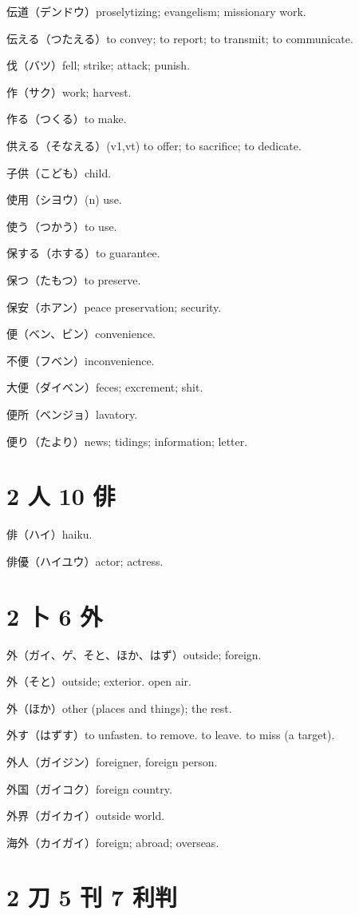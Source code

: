 伝道（デンドウ）proselytizing; evangelism; missionary work.

伝える（つたえる）to convey; to report; to transmit; to communicate.

伐（バツ）fell; strike; attack; punish.

作（サク）work; harvest.

作る（つくる）to make.

供える（そなえる）(v1,vt) to offer; to sacrifice; to dedicate.

子供（こども）child.

使用（シヨウ）(n) use.

使う（つかう）to use.

保する（ホする）to guarantee.

保つ（たもつ）to preserve.

保安（ホアン）peace preservation; security.

便（ベン、ビン）convenience.

不便（フベン）inconvenience.

大便（ダイベン）feces; excrement; shit.

便所（ベンジョ）lavatory.

便り（たより）news; tidings; information; letter.

\section{2 人 10 俳}

俳（ハイ）haiku.

俳優（ハイユウ）actor; actress.

\section{2 卜 6 外}

外（ガイ、ゲ、そと、ほか、はず）outside; foreign.

外（そと）outside; exterior. open air.

外（ほか）other (places and things); the rest.

外す（はずす）to unfasten. to remove. to leave. to miss (a target).

外人（ガイジン）foreigner, foreign person.

外国（ガイコク）foreign country.

外界（ガイカイ）outside world.

海外（カイガイ）foreign; abroad; overseas.

\section{2 刀 5 刊 7 利判}

